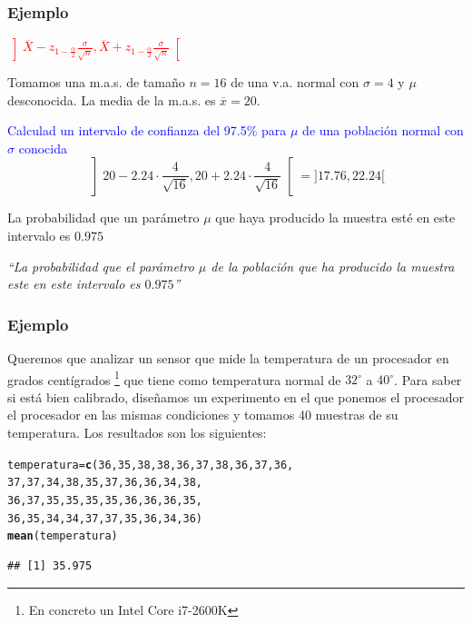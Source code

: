 \documentclass[12pt,t]{beamer}\usepackage[]{graphicx}\usepackage[]{color}
\makeatletter
\newcommand{\hlnum}[1]{\textcolor[rgb]{0.686,0.059,0.569}{#1}}%
\newcommand{\hlstd}[1]{\textcolor[rgb]{0.345,0.345,0.345}{#1}}%
\newcommand{\hlkwb}[1]{\textcolor[rgb]{0.69,0.353,0.396}{#1}}%
\newcommand{\hlkwd}[1]{\textcolor[rgb]{0.737,0.353,0.396}{\textbf{#1}}}%
\newenvironment{kframe}{%
 \def\at@end@of@kframe{}%
 \ifinner\ifhmode%
  \def\at@end@of@kframe{\end{minipage}}%
  \begin{minipage}{\columnwidth}%
 \fi\fi%
 \def\FrameCommand##1{\hskip\@totalleftmargin \hskip-\fboxsep
 \colorbox{shadecolor}{##1}\hskip-\fboxsep
     \hskip-\linewidth \hskip-\@totalleftmargin \hskip\columnwidth}%
 \MakeFramed {\advance\hsize-\width
   \@totalleftmargin\z@ \linewidth\hsize
   \@setminipage}}%
 {\par\unskip\endMakeFramed%
 \at@end@of@kframe}
\newenvironment{knitrout}{}{} %
\newcommand{\red}[1]{\textcolor{red}{#1}}
\newcommand{\blue}[1]{\textcolor{blue}{#1}}
\renewcommand{\emph}[1]{{\color{red}#1}}
\theoremstyle{plain}
\theoremstyle{definition}
\makeatother
\begin{document}
\begin{frame}
\frametitle{Ejemplo}
\red{$\displaystyle
\left]\overline{X} -z_{1-\frac{\alpha}{2}} \frac{\sigma}{\sqrt{n}}, \overline{X}+z_{1-\frac{\alpha}{2}}\frac{\sigma}{\sqrt{n}}
\right[$}
\medskip


Tomamos una m.a.s. de  tamaño  $n=16$ de una v.a. normal con $\sigma=4$ y $\mu$ desconocida. La media   de la m.a.s. es
$\overline{x}=20$.
\medskip

\blue{Calculad un intervalo de confianza  del 97.5\%  para $\mu$ de  una población normal con $\sigma$ conocida}
$$
\left] 20-2.24\cdot \frac{4}{\sqrt{16}} ,
20+2.24\cdot \frac{4}{\sqrt{16}}
\right[
=]17.76,22.24[
$$

La probabilidad que un parámetro $\mu$ que haya producido la muestra esté en este intervalo  es $0.975$
\medskip

\textsl{``La probabilidad que el parámetro $\mu$  de la población que ha producido la muestra este  en este intervalo  es $0.975$''}


\end{frame}


\begin{frame}[fragile]
\frametitle{Ejemplo}
Queremos que analizar un sensor que mide la temperatura de un procesador en grados centígrados \footnote{En concreto un \emph{Intel Core i7-2600K}} que tiene 	como temperatura normal de  $32^{\circ}$ a $40^{\circ}$. Para saber si está bien calibrado, diseñamos un experimento en el que ponemos  el procesador el procesador en las mismas condiciones y  tomamos 40 muestras de su temperatura.
Los resultados son los siguientes:

\begin{knitrout}\small
{}\color{fgcolor}\begin{kframe}
\begin{alltt}
\hlstd{temperatura}\hlkwb{=}\hlkwd{c}\hlstd{(}\hlnum{36}\hlstd{,}\hlnum{35}\hlstd{,}\hlnum{38}\hlstd{,}\hlnum{38}\hlstd{,}\hlnum{36}\hlstd{,}\hlnum{37}\hlstd{,}\hlnum{38}\hlstd{,}\hlnum{36}\hlstd{,}\hlnum{37}\hlstd{,}\hlnum{36}\hlstd{,}
              \hlnum{37}\hlstd{,}\hlnum{37}\hlstd{,}\hlnum{34}\hlstd{,}\hlnum{38}\hlstd{,}\hlnum{35}\hlstd{,}\hlnum{37}\hlstd{,}\hlnum{36}\hlstd{,}\hlnum{36}\hlstd{,}\hlnum{34}\hlstd{,}\hlnum{38}\hlstd{,}
              \hlnum{36}\hlstd{,}\hlnum{37}\hlstd{,}\hlnum{35}\hlstd{,}\hlnum{35}\hlstd{,}\hlnum{35}\hlstd{,}\hlnum{35}\hlstd{,}\hlnum{36}\hlstd{,}\hlnum{36}\hlstd{,}\hlnum{36}\hlstd{,}\hlnum{35}\hlstd{,}
              \hlnum{36}\hlstd{,}\hlnum{35}\hlstd{,}\hlnum{34}\hlstd{,}\hlnum{34}\hlstd{,}\hlnum{37}\hlstd{,}\hlnum{37}\hlstd{,}\hlnum{35}\hlstd{,}\hlnum{36}\hlstd{,}\hlnum{34}\hlstd{,}\hlnum{36}\hlstd{)}
\hlkwd{mean}\hlstd{(temperatura)}
\end{alltt}
\begin{verbatim}
## [1] 35.975
\end{verbatim}
\end{kframe}
\end{knitrout}

\end{frame}
\end{document}

